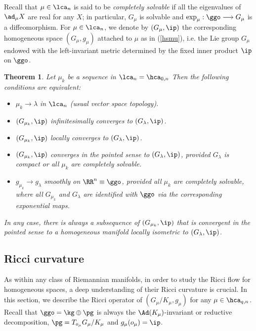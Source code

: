 \documentclass[11pt]{amsart}
\theoremstyle{plain}
\newtheorem{theorem}{Theorem}[section]
\theoremstyle{definition}
\theoremstyle{remark}
\begin{document}
Recall that $\mu\in\lca_n$ is said to be {\it completely solvable} if all the eigenvalues of $\ad_\mu{X}$ are real for any $X$; in particular, $G_\mu$ is solvable and $\exp_\mu:\ggo\longrightarrow G_\mu$ is a diffeomorphism.  For $\mu\in\lca_n$, we denote by $(G_\mu,\ip)$ the corresponding homogeneous space $(G_\mu,g_\mu)$ attached to $\mu$ as in (\ref{hsmu}), i.e. the Lie group $G_\mu$ endowed with the left-invariant metric determined by the fixed inner product $\ip$ on $\ggo$.

\begin{theorem}\label{convmu3}\cite[Corollary 6.20]{spacehm}
Let $\mu_k$ be a sequence in $\lca_n=\hca_{0,n}$   Then the following conditions are equivalent:
\begin{itemize}
\item[(i)] $\mu_k\to\lambda$ in $\lca_n$ (usual vector space topology).

\item[(ii)] $(G_{\mu_k},\ip)$ infinitesimally converges to $(G_{\lambda},\ip)$.

\item[(iii)] $(G_{\mu_k},\ip)$ locally converges to $(G_{\lambda},\ip)$.

\item[(iv)] $(G_{\mu_k},\ip)$ converges in the pointed sense to $(G_{\lambda},\ip)$, provided $G_\lambda$ is compact or all $\mu_k$ are completely solvable.

\item[(v)] $g_{\mu_k}\to g_\lambda$ smoothly on $\RR^n\equiv\ggo$, provided all $\mu_k$ are completely solvable, where all $G_{\mu_k}$ and $G_\lambda$ are identified with $\ggo$ via the corresponding exponential maps.
\end{itemize}
In any case, there is always a subsequence of $(G_{\mu_k},\ip)$ that is convergent in the pointed sense to a homogeneous manifold locally isometric to $(G_{\lambda},\ip)$.
\end{theorem}









\subsection{Ricci curvature}\label{riccisec}
As within any class of Riemannian manifolds, in order to study the Ricci flow for homogeneous spaces, a deep understanding of their Ricci curvature is crucial.  In this section, we describe the Ricci operator of $\left(G_\mu/K_\mu,g_\mu\right)$ for any $\mu\in\hca_{q,n}$.  Recall that $\ggo=\kg\oplus\pg$ is always the  $\Ad(K_{\mu})$-invariant or reductive decomposition, $\pg=T_{o_\mu}G_\mu/K_\mu$ and $g_\mu(o_\mu)=\ip$.
\end{document}
